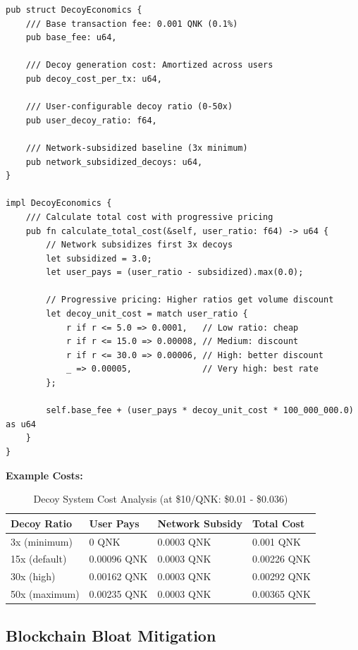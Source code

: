 \documentclass[12pt,a4paper]{article}
\begin{document}
\begin{lstlisting}[style=rustcode, caption=Adaptive Decoy Economics]
pub struct DecoyEconomics {
    /// Base transaction fee: 0.001 QNK (0.1%)
    pub base_fee: u64,

    /// Decoy generation cost: Amortized across users
    pub decoy_cost_per_tx: u64,

    /// User-configurable decoy ratio (0-50x)
    pub user_decoy_ratio: f64,

    /// Network-subsidized baseline (3x minimum)
    pub network_subsidized_decoys: u64,
}

impl DecoyEconomics {
    /// Calculate total cost with progressive pricing
    pub fn calculate_total_cost(&self, user_ratio: f64) -> u64 {
        // Network subsidizes first 3x decoys
        let subsidized = 3.0;
        let user_pays = (user_ratio - subsidized).max(0.0);

        // Progressive pricing: Higher ratios get volume discount
        let decoy_unit_cost = match user_ratio {
            r if r <= 5.0 => 0.0001,   // Low ratio: cheap
            r if r <= 15.0 => 0.00008, // Medium: discount
            r if r <= 30.0 => 0.00006, // High: better discount
            _ => 0.00005,              // Very high: best rate
        };

        self.base_fee + (user_pays * decoy_unit_cost * 100_000_000.0) as u64
    }
}
\end{lstlisting}

\textbf{Example Costs:}
\begin{table}[h]
\centering
\begin{tabular}{llll}
\toprule
\textbf{Decoy Ratio} & \textbf{User Pays} & \textbf{Network Subsidy} & \textbf{Total Cost} \\
\midrule
3x (minimum) & 0 QNK & 0.0003 QNK & 0.001 QNK \\
15x (default) & 0.00096 QNK & 0.0003 QNK & 0.00226 QNK \\
30x (high) & 0.00162 QNK & 0.0003 QNK & 0.00292 QNK \\
50x (maximum) & 0.00235 QNK & 0.0003 QNK & 0.00365 QNK \\
\bottomrule
\end{tabular}
\caption{Decoy System Cost Analysis (at \$10/QNK: \$0.01 - \$0.036)}
\end{table}

\subsection{Blockchain Bloat Mitigation}
\end{document}
